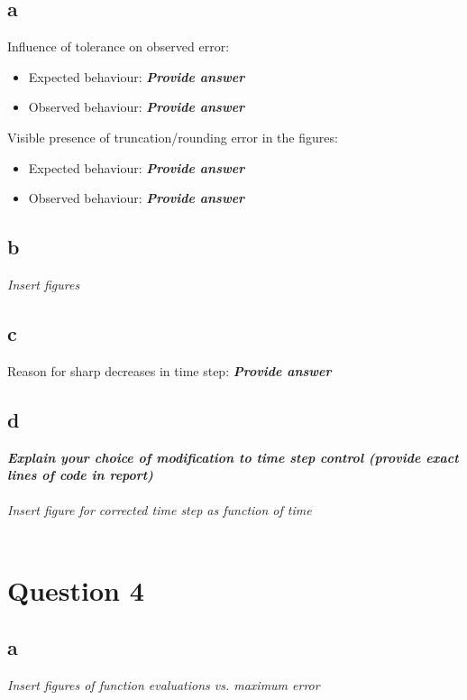 \documentclass{report}
\begin{document}
\subsection*{a}
Influence of tolerance on observed error:
\begin{itemize}
\item Expected behaviour: \textbf{\textit{Provide answer}}
\item Observed behaviour: \textbf{\textit{Provide answer}}
\end{itemize}
Visible presence of truncation/rounding error in the figures:
\begin{itemize}
\item Expected behaviour: \textbf{\textit{Provide answer}}
\item Observed behaviour: \textbf{\textit{Provide answer}}
\end{itemize}
\subsection*{b}
\textit{Insert figures}
\subsection*{c}
Reason for sharp decreases in time step: \textbf{\textit{Provide answer}}
\subsection*{d}
\textbf{\textit{Explain your choice of modification to time step control (provide exact lines of code in report)}}\\
\\
\textit{Insert figure for corrected time step as function of time}\\
\\

\clearpage
\section*{Question 4}
\subsection*{a}
\textit{Insert figures of function evaluations vs. maximum error}
\end{document}
